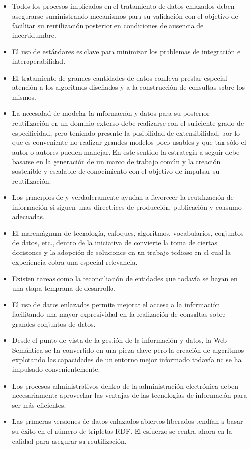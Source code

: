 \documentclass[a4paper,final,11pt,fleqn,twoside]{book}  %
\begin{document}
\begin{itemize}
 \item Todos los procesos implicados en el tratamiento de datos enlazados deben asegurarse suministrando 
mecanismos para su validación con el objetivo de facilitar su reutilización posterior en condiciones 
de ausencia de incertidumbre.
  \item El uso de estándares es clave para minimizar los problemas de integración e interoperabilidad.
 \item El tratamiento de grandes cantidades de datos conlleva prestar especial atención a los algoritmos diseñados y 
a la construcción de consultas sobre los mismos.
 \item La necesidad de modelar la información y datos para su posterior reutilización en un dominio extenso debe realizarse 
con el suficiente grado de especificidad, pero teniendo presente la posibilidad de extensibilidad, por lo que es conveniente 
no realizar grandes modelos poco usables y que tan sólo el autor o autores pueden manejar. En este sentido la estrategia 
a seguir debe basarse en la generación de un marco de trabajo común y la creación sostenible y escalable de conocimiento 
con el objetivo de impulsar su reutilización.
 \item Los principios de \linkeddata y \opendata verdaderamente ayudan a favorecer la reutilización de información si siguen 
unas directrices de producción, publicación y consumo adecuadas.
 \item El maremágnum de tecnología, enfoques, algoritmos, vocabularios, conjuntos de datos, etc., dentro de la iniciativa de 
\linkeddata convierte la toma de ciertas decisiones y la adopción de soluciones en un trabajo tedioso en el cual la experiencia 
cobra una especial relevancia. 
 \item Existen tareas como la reconciliación de entidades que todavía se hayan en una etapa temprana de desarrollo.
 \item El uso de datos enlazados permite mejorar el acceso a la información facilitando una mayor expresividad en la realización 
de consultas sobre grandes conjuntos de datos.
 \item Desde el punto de vista de la gestión de la información y datos, la Web Semántica se ha convertido en una pieza clave pero 
la creación de algoritmos explotando las capacidades de un entorno mejor informado todavía no se ha impulsado convenientemente.
\item Los procesos administrativos dentro de la administración electrónica deben necesariamente aprovechar las ventajas 
de las tecnologías de información para ser más eficientes.
\item Las primeras versiones de datos enlazados abiertos liberados tendían a basar su éxito en el número de tripletas RDF. El esfuerzo se 
centra ahora en la calidad para asegurar su reutilización.
\end{itemize}
\end{document}
